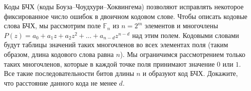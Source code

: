 Коды БЧХ (коды Боуза–Чоудхури–Хоквингема) позволяют исправлять некоторое фиксированное число ошибок в двоичном кодовом
слове. Чтобы описать кодовые слова БЧХ, мы рассмотрим поле $\mathbb{F}_n$ из $n = 2^m$ элементов и многочлены $P(z) = a_0 +
a_1 z + a_2 z^2 + \dots + a_{n - d} z^{n - d}$ над этим полем. Кодовыми словами будут таблицы значений таких многочленов во
всех элементах поля (таким образом, длина кодового слова равна $n$). Мы ограничимся рассмотрением только таких многочленов,
которые в каждой точке поля принимают значение $0$ или $1$. Все такие последовательности битов длины $n$ и образуют код
БЧХ. Докажите, что расстояние данного кода не менее $d$.